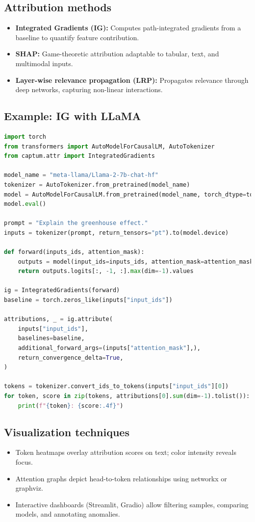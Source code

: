 \documentclass{article}
\begin{document}
\subsection{Attribution methods}
\begin{itemize}
  \item \textbf{Integrated Gradients (IG):} Computes path-integrated gradients from a baseline to quantify feature contribution.
  \item \textbf{SHAP:} Game-theoretic attribution adaptable to tabular, text, and multimodal inputs.
  \item \textbf{Layer-wise relevance propagation (LRP):} Propagates relevance through deep networks, capturing non-linear interactions.
\end{itemize}

\subsection{Example: IG with LLaMA}
\begin{lstlisting}[language=Python,caption={Integrated Gradients attribution for a LLaMA model}]
import torch
from transformers import AutoModelForCausalLM, AutoTokenizer
from captum.attr import IntegratedGradients

model_name = "meta-llama/Llama-2-7b-chat-hf"
tokenizer = AutoTokenizer.from_pretrained(model_name)
model = AutoModelForCausalLM.from_pretrained(model_name, torch_dtype=torch.float16).cuda()
model.eval()

prompt = "Explain the greenhouse effect."
inputs = tokenizer(prompt, return_tensors="pt").to(model.device)

def forward(inputs_ids, attention_mask):
    outputs = model(input_ids=inputs_ids, attention_mask=attention_mask)
    return outputs.logits[:, -1, :].max(dim=-1).values

ig = IntegratedGradients(forward)
baseline = torch.zeros_like(inputs["input_ids"])

attributions, _ = ig.attribute(
    inputs["input_ids"],
    baselines=baseline,
    additional_forward_args=(inputs["attention_mask"],),
    return_convergence_delta=True,
)

tokens = tokenizer.convert_ids_to_tokens(inputs["input_ids"][0])
for token, score in zip(tokens, attributions[0].sum(dim=-1).tolist()):
    print(f"{token}: {score:.4f}")
\end{lstlisting}

\subsection{Visualization techniques}
\begin{itemize}
  \item Token heatmaps overlay attribution scores on text; color intensity reveals focus.
  \item Attention graphs depict head-to-token relationships using networkx or graphviz.
  \item Interactive dashboards (Streamlit, Gradio) allow filtering samples, comparing models, and annotating anomalies.
\end{itemize}
\end{document}

